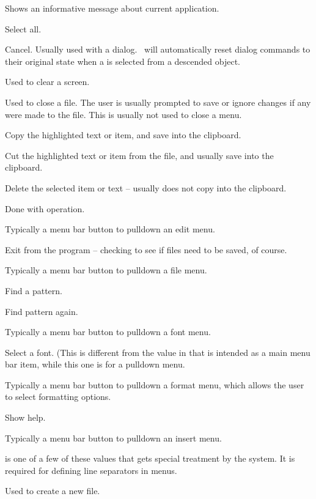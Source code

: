  Shows an informative message about current application.

 Select all.

 Cancel. Usually used with a dialog. \V\ will
automatically reset dialog commands to their original state when
a  is selected from a  descended
object.

 Used to clear a screen.

 Used to close a file. The user is usually
prompted to save or ignore changes if any were made to the file. This
is usually not used to close a menu.

 Copy the highlighted text or item, and save into
the clipboard.

 Cut the highlighted text or item from the file, and
usually save into the clipboard.

 Delete the selected item or text -- usually
does not copy into the clipboard.

 Done with operation.

 Typically a menu bar button to pulldown an edit menu.

 Exit from the program -- checking to see if files
need to be saved, of course.

 Typically a menu bar button to pulldown a file menu.

 Find a pattern.

 Find pattern again.

 Typically a menu bar button to pulldown a font menu.

 Select a font. (This is different from the
 value in that  is intended as a main
menu bar item, while this one is for a pulldown menu.

 Typically a menu bar button to pulldown a format menu, which
allows the user to select formatting options.

 Show help.

 Typically a menu bar button to pulldown an insert menu.

  is one of a few of these values
that gets special treatment by the system.  It is required for
defining line separators in menus.

 Used to create a new file.


